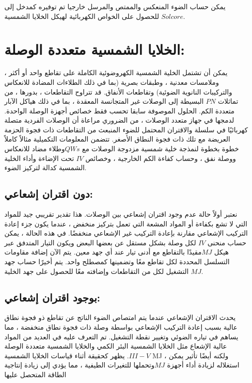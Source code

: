 يمكن حساب الضوء المنعكس والممتص والمرسل خارجيا تم توفيره كمدخل إلى $ Solcore $  للحصول على الخواص الكهربائية لهيكل الخلايا الشمسية.

\section{الخلايا الشمسية متعددة الوصلة:}
يمكن أن تشتمل الخلية الشمسية الكهروضوئية الكاملة على تقاطع واحد أو أكثر ، وملامسات معدنية ، وطبقات بصرية (بما في ذلك الطلاءات المضادة للانعكاس والتركيبات النانوية الضوئية) وتقاطعات الأنفاق. قد تتراوح التقاطعات ، بدورها ، من تماثلات $ PN $ البسيطة إلى الوصلات غير المتجانسة المعقدة ، بما في ذلك هياكل الآبار متعددة الكم. الحلول الموصوفة سابقا تحسب فقط خصائص أجهزة الوصلة الواحدة. لدمجها في جهاز متعدد الوصلات ، من الضروري مراعاة أن الوصلات الفردية متصلة كهربائيًا في سلسلة والاقتران المحتمل للضوء المنبعث من التقاطعات ذات فجوة الحزمة العريضة مع تلك ذات فجوة النطاق الأصغر. تتضمن المعلومات التكميلية مثالاً كاملاً خطوة بخطوة لنمذجة خلية شمسية مزدوجة الوصلات مع $ QWs  $وطلاء مضاد للانعكاس ووصلة نفق ، وحساب كفاءة الكم الخارجية ، وخصائص $ IV $ تحت الإضاءة وأداء الخلية الشمسية كدالة لتركيز الضوء.
\subsection{دون اقتران إشعاعي:}
نعتبر أولاً حالة عدم وجود اقتران إشعاعي بين الوصلات. هذا تقدير تقريبي جيد للمواد التي لا تشع بكفاءة أو المواد المشعة التي تعمل بتركيز منخفض ، عندما يكون جزء إعادة التركيب الإشعاعي مقارنة بإعادة التركيب غير الإشعاعي منخفضًا. في هذه الحالة ، يمكن حساب منحنى $ I V $ لكل وصلة بشكل مستقل عن بعضها البعض ويكون التيار المتدفق عبر هيكل $ MJ  $مقيدًا بالتقاطع مع أدنى تيار عند أي جهد معين. يتم الآن إضافة مقاومات التسلسل المحددة لكل تقاطع معًا وتضمينها كمصطلح واحد. يتم أخيرًا حساب جهد التشغيل لكل من التقاطعات وإضافته معًا للحصول على جهد الخلية $ MJ $.
\subsection{بوجود اقتران إشعاعي:}
يحدث الاقتران الإشعاعي عندما يتم امتصاص الضوء الناتج عن تقاطع ذو فجوة نطاق عالية بسبب إعادة التركيب الإشعاعي بواسطة وصلة ذات فجوة نطاق منخفضة ، مما يساهم في تياره الضوئي وتغيير نقطة التشغيل. تم التعرف عليه في العديد من المواد عالية الإشعاع مثل الخلايا الشمسية البئر الكمي والخلايا الشمسية متعددة الوصلة $ III-V $. يظهر كحقيقة أثناء قياسات $  $الخلايا الشمسية MJ ، ولكنه أيضًا تأثير يمكن استغلاله لزيادة أداء أجهزة $ MJ  $وتحملها للتغيرات الطيفية ، مما يؤدي إلى زيادة إنتاجية الطاقة المتحصل عليها
